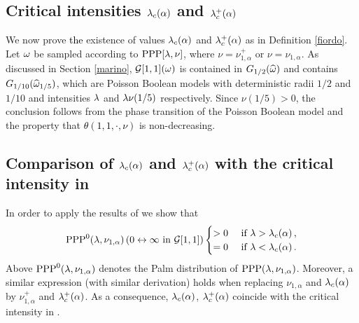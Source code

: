 \documentclass[12pt,a4paper,reqno]{amsart}
\newcommand{\cC}{\ensuremath{\mathcal C}}
\newcommand{\cG}{\ensuremath{\mathcal G}}
\let\a=\alpha \let\b=\beta   \let\d=\delta  \let\e=\varepsilon
\newcommand{\orc}{\textcolor{black}} %
\newcommand{\be}{\begin{equation}}
\newcommand{\en}{\end{equation}}
\begin{document}
\subsection{Critical intensities $\l_c(\a)$ and  $\l^+_c(\a)$}\label{sfondo} We now prove \orc{the} existence of values $\l_c(\a) $ and $\l_c^+(\a)$ as in Definition  \ref{fiordo}.
Let $\omega$ be sampled according to $\text{PPP}[\lambda, \nu]$, where $\nu=\nu_{1,\a}^+$ or $\nu=\nu_{1,\a}$.
As discussed in Section \ref{marino},  $\cG[1,1](\o)$ is contained in $G_{1/2}(\widehat{\omega})$ and contains  $G_{1/10}(\widehat{\omega}_{1/5})$, which are 
  Poisson Boolean models with deterministic radii $1/2$ and $1/10$  and intensities $\lambda$ and  $\lambda \nu(1/5)$ respectively. Since $\nu(1/5)>0$, the conclusion follows from the   phase transition of the Poisson Boolean model and the property that  \orc{$ \theta(1,1, \cdot, \nu)$} is non-decreasing.
  
    
  
   
   
%


\subsection{Comparison of $\l_c(\a)$ and  $\l^+_c(\a)$ with the critical intensity  in \cite{FagMim1}} \label{liberato}
In order to apply the results of \cite{FagMim1} we show that 
\be\label{rinoceronte}
 {\rm PPP}^0(\l, \nu_{1,\a})\left( 0\leftrightarrow \infty\text{ in } \cG[1,1]\right) 
\begin{cases}
>0 &\text{ if } \l > \l_c(\a)\,,\\
=0 &\text{ if } \l < \l_c(\a)\,.
\end{cases} \en
Above ${\rm PPP}^0(\l, \nu_{1,\a})$ denotes the Palm distribution of  ${\rm PPP}(\l, \nu_{1,\a})$.
Moreover, a similar expression (with similar derivation) holds when replacing  $\nu_{1,\a}$ and $\l_c(\a)$ by $\nu^+_{1,\a}$ and $ \l^+_c(\a)$. As a consequence,  $\l_c(\a)$, $\l_c^+(\a)$ coincide with the critical intensity in \cite[Eq.~(1.5)]{FagMim1}. 
\end{document}
